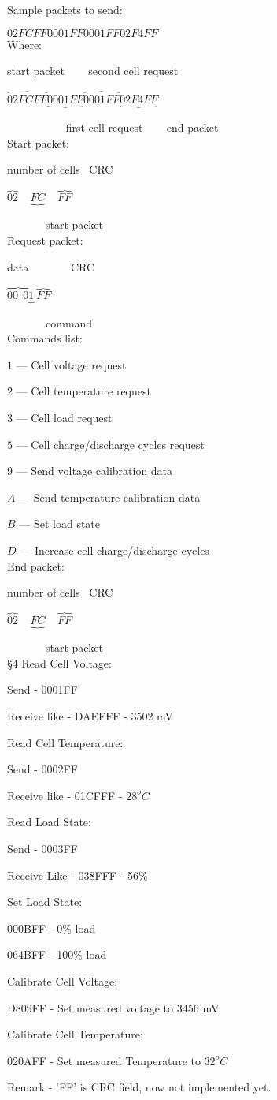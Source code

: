 \documentclass{article}
\begin{document}
Sample packets to send:

$02FCFF 0001FF 0001FF 02F4FF$\\

Where:

start packet ~~~ second cell request

$\overbrace{02FCFF} \underbrace{0001FF} \overbrace{0001FF} \underbrace{02F4FF}$

~~~~~~~~~~ first cell request ~~~ end packet\\

Start packet:

number of cells~ CRC

$\overbrace{02}~~~~~\underbrace{FC}~~~~~\overbrace{FF}$

~~~~~~~start packet\\

Request packet:

data~~~~~~~ CRC

$\overbrace{00~~0}\underbrace{1}~\overbrace{FF}$

~~~~~~~command\\

Commands list:

$1$ --- Cell voltage request

$2$ --- Cell temperature request

$3$ --- Cell load request

$5$ --- Cell charge/discharge cycles request

$9$ --- Send voltage calibration data

$A$ --- Send temperature calibration data

$B$ --- Set load state 

$D$ --- Increase cell charge/discharge cycles\\

End packet:

number of cells~ CRC

$\overbrace{02}~~~~~\underbrace{FC}~~~~~\overbrace{FF}$

~~~~~~~start packet\\


\S 4 Read Cell Voltage:

Send - 0001FF

Receive like - DAEFFF - 3502 mV

Read Cell Temperature:

Send - 0002FF

Receive like - 01CFFF - $28 ^{o}C$

Read Load State:

Send - 0003FF

Receive Like - 038FFF - 56\%

Set Load State:

000BFF - 0\% load

064BFF - 100\% load

Calibrate Cell Voltage:

D809FF - Set measured voltage to 3456 mV

Calibrate Cell Temperature:

020AFF - Set measured Temperature to $32 ^{o}C$


Remark - 'FF' is CRC field, now not implemented yet.

\tableofcontents
\end{document}

